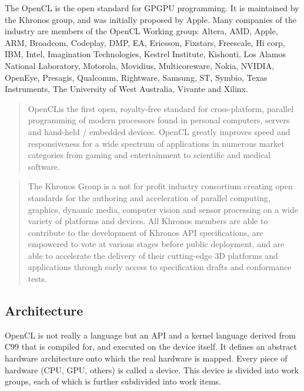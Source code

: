 The \gls{OpenCL} is the open standard for \gls{GPGPU} programming. It is maintained by the Khronos group, and was initially proposed by Apple. Many companies of the industry are members of the \gls{OpenCL} Working group: Altera, AMD, Apple, ARM, Broadcom, Codeplay, DMP, EA, Ericsson, Fixstars, Freescale, Hi corp, IBM, Intel, Imagination Technologies, Kestrel Institute, Kishonti, Los Alamos National Laboratory, Motorola, Movidius, Multicoreware, Nokia, NVIDIA, OpenEye, Presagis, Qualcomm, Rightware, Samsung, ST, Symbio, Texas Instruments, The University of West Australia, Vivante and Xilinx.\cite{opencl}
\begin{quotation}
OpenCL\texttrademark is the first open, royalty-free standard for cross-platform, parallel programming of modern processors found in personal computers, servers and hand-held / embedded devices. \gls{OpenCL} greatly improves speed and responsiveness for a wide spectrum of applications in numerous market categories from gaming and entertainment to scientific and medical software.\cite{opencl}
\end{quotation}
\begin{quotation}
The Khronos Group is a not for profit industry consortium creating open standards for the authoring and acceleration of parallel computing, graphics, dynamic media, computer vision and sensor processing on a wide variety of platforms and devices. All Khronos members are able to contribute to the development of Khronos \gls{API} specifications, are empowered to vote at various stages before public deployment, and are able to accelerate the delivery of their cutting-edge 3D platforms and applications through early access to specification drafts and conformance tests.\cite{khronos}
\end{quotation}

\subsection{Architecture}

\gls{OpenCL} is not really a language but an \gls{API} and a kernel language derived from C99 that is compiled for, and executed on the device itself. It defines an abstract hardware architecture onto which the real hardware is mapped. Every piece of hardware (\gls{CPU}, \gls{GPU}, others) is called a device. This device is divided into work groups, each of which is further subdivided into work items.

